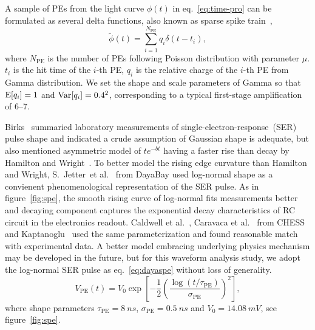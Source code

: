 A sample of PEs from the light curve $\phi(t)$ in eq.~\eqref{eq:time-pro} can be formulated as several delta functions, also known as sparse spike train~\cite{levy_reconstruction_1981}, 
\begin{equation}
  \label{eq:lc-sample}
  \tilde{\phi}(t) = \sum_{i=1}^{N_{\mathrm{PE}}} q_i \delta(t-t_i),
\end{equation}
where $N_\mathrm{PE}$ is the number of PEs following Poisson distribution with parameter $\mu$.  $t_i$ is the hit time of the $i$-th PE, $q_i$ is the relative charge of the $i$-th PE from Gamma distribution.  We set the shape and scale parameters of Gamma so that $\operatorname{E}[q_i] = 1$ and $\operatorname{Var}[q_i] = 0.4^2$, corresponding to a typical first-stage amplification of 6--7.

Birks~\cite{birks_theory_1967} summaried laboratory measurements of single-electron-response~(SER) pulse shape and indicated a crude assumption of Gaussian shape is adequate, but also mentioned asymmetric model of $t e^{-bt}$ having a faster rise than decay by Hamilton and Wright~\cite{hamilton_transit_1956}.  To better model the rising edge curvature than Hamilton and Wright, S.~Jetter~et al.~\cite{jetter_pmt_2012} from DayaBay used log-normal shape as a convienent phenomenological representation of the SER pulse.  As in figure~\ref{fig:spe}, the smooth rising curve of log-normal fits measurements better and decaying component captures the exponential decay characteristics of RC circuit in the electronics readout.  Caldwell et al.~\cite{caldwell_characterization_2013}, Caravaca et al.~\cite{caravaca_experiment_2017} from CHESS and Kaptanoglu~\cite{kaptanoglu_characterization_2018} used the same parameterization and found reasonable match with experimental data.  A better model embracing underlying physics mechanism may be developed in the future, but for this waveform analysis study, we adopt the log-normal SER pulse as eq.~\eqref{eq:dayaspe} without loss of generality.
\begin{equation}
  V_\mathrm{PE}(t) = V_{0}\exp\left[-\frac{1}{2}\left(\frac{\log(t/\tau_\mathrm{PE})}{\sigma_\mathrm{PE}}\right)^{2}\right],
  \label{eq:dayaspe}
\end{equation}
where shape parameters $\tau_\mathrm{PE}=\SI{8}{ns}$, $\sigma_\mathrm{PE}=\SI{0.5}{ns}$ and $V_{0}=\SI{14.08}{mV}$, see figure~\ref{fig:spe}.

